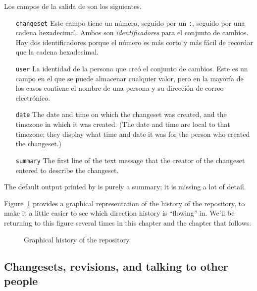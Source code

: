Los campos de la salida de  son los siguientes.
\begin{itemize}
    \item[\texttt{changeset}]\hspace{-0.5em} Este campo
        tiene un número, seguido por un
        \texttt{:}, seguido por una cadena hexadecimal. Ambos son
        \emph{identificadores} para el conjunto de cambios. Hay dos
        identificadores porque el número es más corto y más fácil de
        recordar que la cadena hexadecimal.
        
\item[\texttt{user}]\hspace{-0.5em} La identidad de la
    persona que creó el conjunto de cambios. Este es un campo en el
    que se puede almacenar cualquier valor, pero en la mayoría de los
    casos contiene el nombre de una persona y su dirección de correo
    electrónico.
    
\item[\texttt{date}] The date and time on which the changeset was
  created, and the timezone in which it was created.  (The date and
  time are local to that timezone; they display what time and date it
  was for the person who created the changeset.)
\item[\texttt{summary}] The first line of the text message that the
  creator of the changeset entered to describe the changeset.
\end{itemize}
The default output printed by  is purely a summary; it is
missing a lot of detail.

Figure~\ref{fig:tour-basic:history} provides a graphical representation of
the history of the  repository, to make it a little
easier to see which direction history is ``flowing'' in.  We'll be
returning to this figure several times in this chapter and the chapter
that follows.

\begin{figure}[ht]
  \centering
  \caption{Graphical history of the  repository}
  \label{fig:tour-basic:history}
\end{figure}

\subsection{Changesets, revisions, and talking to other 
  people}

